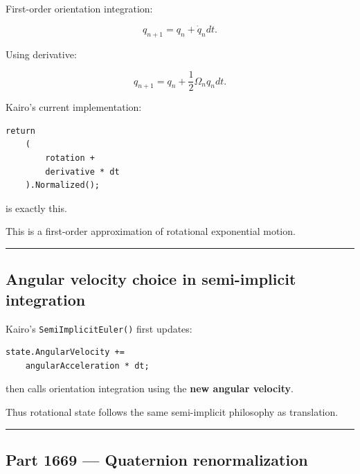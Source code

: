 \hypertarget{06-engine-ii-ch037-part-1668-quaternion-orientation-integration}{}

First-order orientation integration:

\[
q_{n+1}
=
q_n+
\dot q_n dt.
\]

Using derivative:

\[
\boxed{
q_{n+1}
=
q_n+
\frac12
\Omega_n q_n dt.
}
\]

Kairo's current implementation:

\begin{verbatim}
return
    (
        rotation +
        derivative * dt
    ).Normalized();
\end{verbatim}

is exactly this.

This is a first-order approximation of rotational exponential motion.

\begin{center}\rule{0.5\linewidth}{0.5pt}\end{center}

\subsection{Angular velocity choice in semi-implicit integration}\label{06-engine-ii-ch037-angular-velocity-choice-in-semi-implicit-integration}

\hypertarget{06-engine-ii-ch037-angular-velocity-choice-in-semi-implicit-integration}{}

Kairo's \texttt{SemiImplicitEuler()} first updates:

\begin{verbatim}
state.AngularVelocity +=
    angularAcceleration * dt;
\end{verbatim}

then calls orientation integration using the \textbf{new angular velocity}.

Thus rotational state follows the same semi-implicit philosophy as translation.

\begin{center}\rule{0.5\linewidth}{0.5pt}\end{center}

\subsection{Part 1669 --- Quaternion renormalization}\label{06-engine-ii-ch037-part-1669-quaternion-renormalization}

\hypertarget{06-engine-ii-ch037-part-1669-quaternion-renormalization}{}

